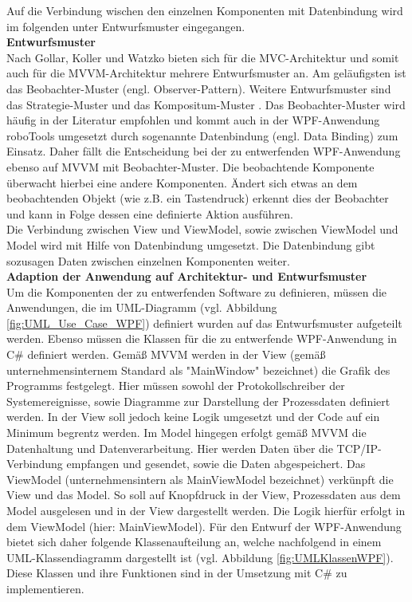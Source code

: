 \documentclass[ a4paper,
                oneside,
                toc=bibliography,
                toc=listof
                ]{scrbook}
\begin{document}
	Auf die Verbindung wischen den einzelnen Komponenten mit Datenbindung wird im folgenden unter Entwurfsmuster eingegangen.\\
	\textbf{Entwurfsmuster}\\
	Nach Gollar, Koller und Watzko \cite{ArchitekturmusterGoll} bieten sich für die MVC-Architektur und somit auch für die MVVM-Architektur mehrere Entwurfsmuster an. Am geläufigsten ist das Beobachter-Muster (engl. Observer-Pattern). Weitere Entwurfsmuster sind das Strategie-Muster und das Kompositum-Muster \cite{ArchitekturmusterGoll}. Das Beobachter-Muster wird häufig in der Literatur empfohlen und kommt auch in der WPF-Anwendung roboTools umgesetzt durch sogenannte Datenbindung (engl. Data Binding) zum Einsatz. Daher fällt die Entscheidung bei der zu entwerfenden WPF-Anwendung ebenso auf MVVM mit Beobachter-Muster. Die beobachtende Komponente überwacht hierbei eine andere Komponenten. Ändert sich etwas an dem beobachtenden Objekt (wie z.B. ein Tastendruck) erkennt dies der Beobachter und kann in Folge dessen eine definierte Aktion ausführen. \cite{ArchitekturmusterGoll}\\
	Die Verbindung zwischen View und ViewModel, sowie zwischen ViewModel und Model wird mit Hilfe von Datenbindung umgesetzt. Die Datenbindung gibt sozusagen Daten zwischen einzelnen Komponenten weiter.\\
	\textbf{Adaption der Anwendung auf Architektur- und Entwurfsmuster}\\
	Um die Komponenten der zu entwerfenden Software zu definieren, müssen die Anwendungen, die im UML-Diagramm (vgl. Abbildung \ref{fig:UML_Use_Case_WPF}) definiert wurden auf das Entwurfsmuster aufgeteilt werden. Ebenso müssen die Klassen für die zu entwerfende WPF-Anwendung in C\# definiert werden. Gemäß MVVM werden in der View (gemäß unternehmensinternem Standard als "MainWindow" bezeichnet)
	die Grafik des Programms festgelegt. Hier müssen sowohl der Protokollschreiber der Systemereignisse, sowie Diagramme zur Darstellung der Prozessdaten definiert werden. In der View soll jedoch keine Logik umgesetzt und der Code auf ein Minimum begrentz werden. Im Model hingegen erfolgt gemäß MVVM die Datenhaltung und Datenverarbeitung. Hier werden Daten über die TCP/IP-Verbindung empfangen und gesendet, sowie die Daten abgespeichert. Das ViewModel (unternehmensintern als MainViewModel bezeichnet) verkünpft die View und das Model. So soll auf Knopfdruck in der View, Prozessdaten aus dem Model ausgelesen und in der View dargestellt werden. Die Logik hierfür erfolgt in dem ViewModel (hier: MainViewModel). Für den Entwurf der WPF-Anwendung bietet sich daher folgende Klassenaufteilung an, welche nachfolgend in einem UML-Klassendiagramm dargestellt ist (vgl. Abbildung \ref{fig:UMLKlassenWPF}). Diese Klassen und ihre Funktionen sind in der Umsetzung mit C\# zu implementieren.
\end{document}
